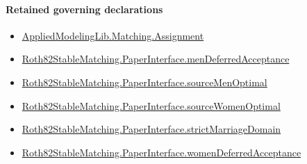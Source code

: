 \documentclass[10pt]{article}
\begin{document}
\paragraph{Retained governing declarations}
\begin{itemize}\raggedright
\item \hyperlink{governing-declaration-508c084086b006b8}{Applied\allowbreak{}Modeling\allowbreak{}Lib.\allowbreak{}Matching.\allowbreak{}Assignment}
\item \hyperlink{governing-declaration-7357e0557237bc7e}{Roth82\allowbreak{}Stable\allowbreak{}Matching.\allowbreak{}Paper\allowbreak{}Interface.\allowbreak{}men\allowbreak{}Deferred\allowbreak{}Acceptance}
\item \hyperlink{paper-prerequisite-44aa864d4a515095}{Roth82\allowbreak{}Stable\allowbreak{}Matching.\allowbreak{}Paper\allowbreak{}Interface.\allowbreak{}source\allowbreak{}Men\allowbreak{}Optimal}
\item \hyperlink{paper-prerequisite-6c23e95d9facee8d}{Roth82\allowbreak{}Stable\allowbreak{}Matching.\allowbreak{}Paper\allowbreak{}Interface.\allowbreak{}source\allowbreak{}Women\allowbreak{}Optimal}
\item \hyperlink{governing-declaration-d06ec2a2987f0c72}{Roth82\allowbreak{}Stable\allowbreak{}Matching.\allowbreak{}Paper\allowbreak{}Interface.\allowbreak{}strict\allowbreak{}Marriage\allowbreak{}Domain}
\item \hyperlink{governing-declaration-13c08a3bc523499b}{Roth82\allowbreak{}Stable\allowbreak{}Matching.\allowbreak{}Paper\allowbreak{}Interface.\allowbreak{}women\allowbreak{}Deferred\allowbreak{}Acceptance}
\end{itemize}
\end{document}
